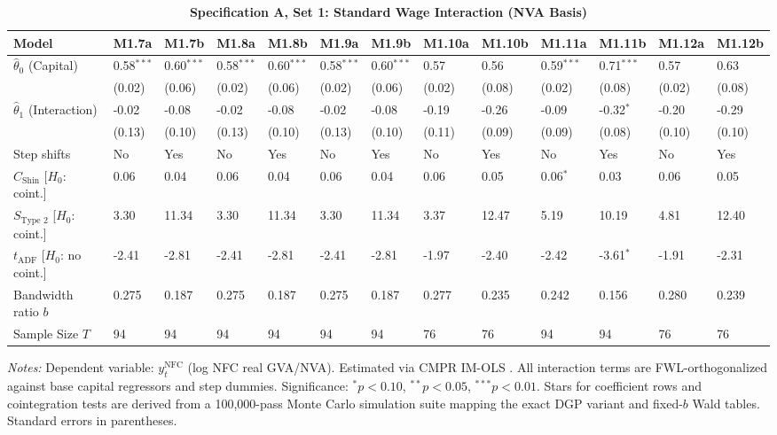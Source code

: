 \FloatBarrier
\begin{table}[h!]
\centering
\caption{\textbf{Specification A, Set 1: Standard Wage Interaction (NVA Basis)}}
\label{tab:specA_set1_nva_app}
\tiny
\setlength{\tabcolsep}{1.5pt}
\begin{tabular}{p{3.2cm}p{1.0cm}p{1.0cm}p{1.0cm}p{1.0cm}p{1.0cm}p{1.0cm}p{1.0cm}p{1.0cm}p{1.0cm}p{1.0cm}p{1.0cm}p{1.0cm}}
\toprule
Model & M1.7a & M1.7b & M1.8a & M1.8b & M1.9a & M1.9b & M1.10a & M1.10b & M1.11a & M1.11b & M1.12a & M1.12b \\
\midrule
$\hat{\theta}_0$ (Capital) & 0.58$^{***}$ & 0.60$^{***}$ & 0.58$^{***}$ & 0.60$^{***}$ & 0.58$^{***}$ & 0.60$^{***}$ & 0.57 & 0.56 & 0.59$^{***}$ & 0.71$^{***}$ & 0.57 & 0.63 \\
 & (0.02) & (0.06) & (0.02) & (0.06) & (0.02) & (0.06) & (0.02) & (0.08) & (0.02) & (0.08) & (0.02) & (0.08) \\
$\hat{\theta}_1$ (Interaction) & -0.02 & -0.08 & -0.02 & -0.08 & -0.02 & -0.08 & -0.19 & -0.26 & -0.09 & -0.32$^{*}$ & -0.20 & -0.29 \\
 & (0.13) & (0.10) & (0.13) & (0.10) & (0.13) & (0.10) & (0.11) & (0.09) & (0.09) & (0.08) & (0.10) & (0.10) \\
\midrule
Step shifts & No & Yes & No & Yes & No & Yes & No & Yes & No & Yes & No & Yes \\
$C_{\text{Shin}}$ [$H_0$: coint.] & 0.06 & 0.04 & 0.06 & 0.04 & 0.06 & 0.04 & 0.06 & 0.05 & 0.06$^{*}$ & 0.03 & 0.06 & 0.05 \\
$S_{\text{Type 2}}$ [$H_0$: coint.] & 3.30 & 11.34 & 3.30 & 11.34 & 3.30 & 11.34 & 3.37 & 12.47 & 5.19 & 10.19 & 4.81 & 12.40 \\
$t_{\text{ADF}}$ [$H_0$: no coint.] & -2.41 & -2.81 & -2.41 & -2.81 & -2.41 & -2.81 & -1.97 & -2.40 & -2.42 & -3.61$^{*}$ & -1.91 & -2.31 \\
Bandwidth ratio $b$ & 0.275 & 0.187 & 0.275 & 0.187 & 0.275 & 0.187 & 0.277 & 0.235 & 0.242 & 0.156 & 0.280 & 0.239 \\
Sample Size $T$ & 94 & 94 & 94 & 94 & 94 & 94 & 76 & 76 & 94 & 94 & 76 & 76 \\
\bottomrule
\end{tabular}
\begin{minipage}{\textwidth}
\scriptsize
\textit{Notes:} Dependent variable: $y_t^{\text{NFC}}$ (log NFC real GVA/NVA). Estimated via CMPR IM-OLS \citep{VogelsangWagner2014}. All interaction terms are FWL-orthogonalized against base capital regressors and step dummies. Significance: $^*p<0.10$, $^{**}p<0.05$, $^{***}p<0.01$. Stars for coefficient rows and cointegration tests are derived from a 100,000-pass Monte Carlo simulation suite mapping the exact DGP variant and fixed-$b$ Wald tables. Standard errors in parentheses.
\end{minipage}
\end{table}

